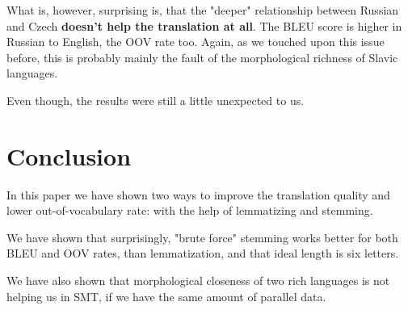 \documentclass[11pt,letterpaper]{article}
\begin{document}
What is, however, surprising is, that the "deeper" relationship between Russian and Czech \textbf{doesn't help the translation at all}. The BLEU score is higher in Russian to English, the OOV rate too. Again, as we touched upon this issue before, this is probably mainly the fault of the morphological richness of Slavic languages.

Even though, the results were still a little unexpected to us.

\section{Conclusion}
In this paper we have shown two ways to improve the translation quality and lower out-of-vocabulary rate: with the help of lemmatizing and stemming. 


We have shown that surprisingly, "brute force" stemming works better for both BLEU and OOV rates, than lemmatization, and that ideal length is six letters. 

We have also shown that morphological closeness of two rich languages is not helping us in SMT, if we have the same amount of parallel data.




\end{document}
